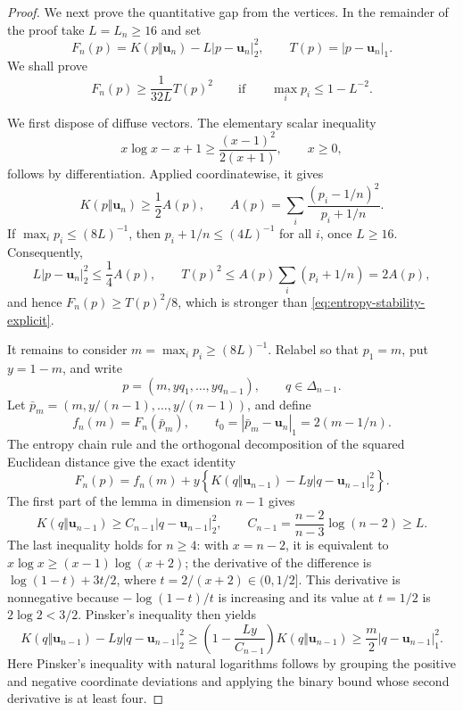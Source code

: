 \begin{proof}
We next prove the quantitative gap from the vertices. In the remainder of
the proof take \(L=L_n\ge16\) and set
\[
  F_n(p)=K(p\Vert\mathbf u_n)-L|p-\mathbf u_n|_2^2,
  \qquad T(p)=|p-\mathbf u_n|_1.
\]
We shall prove
\begin{equation}
\label{eq:entropy-stability-explicit}
  F_n(p)\ge\frac1{32L}T(p)^2
  \qquad\text{if}\qquad
  \max_i p_i\le1-L^{-2}.
\end{equation}

We first dispose of diffuse vectors. The elementary scalar inequality
\[
  x\log x-x+1\ge\frac{(x-1)^2}{2(x+1)},
  \qquad x\ge0,
\]
follows by differentiation. Applied coordinatewise, it gives
\[
  K(p\Vert\mathbf u_n)\ge\frac12 A(p),
  \qquad
  A(p)=\sum_i\frac{(p_i-1/n)^2}{p_i+1/n}.
\]
If \(\max_i p_i\le(8L)^{-1}\), then
\(p_i+1/n\le(4L)^{-1}\) for all \(i\), once \(L\ge16\). Consequently,
\[
  L|p-\mathbf u_n|_2^2\le\frac14A(p),
  \qquad
  T(p)^2\le A(p)\sum_i(p_i+1/n)=2A(p),
\]
and hence \(F_n(p)\ge T(p)^2/8\), which is stronger than
\eqref{eq:entropy-stability-explicit}.

It remains to consider \(m=\max_i p_i\ge(8L)^{-1}\). Relabel so that
\(p_1=m\), put \(y=1-m\), and write
\[
  p=(m,yq_1,\ldots,yq_{n-1}),
  \qquad q\in\Delta_{n-1}.
\]
Let \(\bar p_m=(m,y/(n-1),\ldots,y/(n-1))\), and define
\[
  f_n(m)=F_n(\bar p_m),
  \qquad t_0=|\bar p_m-\mathbf u_n|_1=2(m-1/n).
\]
The entropy chain rule and the orthogonal decomposition of the squared
Euclidean distance give the exact identity
\begin{equation}
\label{eq:largest-coordinate-decomposition}
  F_n(p)
  =f_n(m)+y\left\{
     K(q\Vert\mathbf u_{n-1})-Ly|q-\mathbf u_{n-1}|_2^2
   \right\}.
\end{equation}
The first part of the lemma in dimension \(n-1\) gives
\[
  K(q\Vert\mathbf u_{n-1})\ge C_{n-1}|q-\mathbf u_{n-1}|_2^2,
  \qquad
  C_{n-1}=\frac{n-2}{n-3}\log(n-2)\ge L.
\]
The last inequality holds for \(n\ge4\): with \(x=n-2\), it is equivalent
to \(x\log x\ge(x-1)\log(x+2)\); the derivative of the difference is
\(\log(1-t)+3t/2\), where \(t=2/(x+2)\in(0,1/2]\). This derivative is
nonnegative because \(-\log(1-t)/t\) is increasing and its value at
\(t=1/2\) is \(2\log2<3/2\).
Pinsker's inequality then yields
\begin{equation}
\label{eq:conditional-tail-stability}
  K(q\Vert\mathbf u_{n-1})-Ly|q-\mathbf u_{n-1}|_2^2
  \ge
  \left(1-\frac{Ly}{C_{n-1}}\right)K(q\Vert\mathbf u_{n-1})
  \ge\frac m2|q-\mathbf u_{n-1}|_1^2.
\end{equation}
Here Pinsker's inequality with natural logarithms follows by grouping the
positive and negative coordinate deviations and applying the binary bound
whose second derivative is at least four.


\end{proof}
